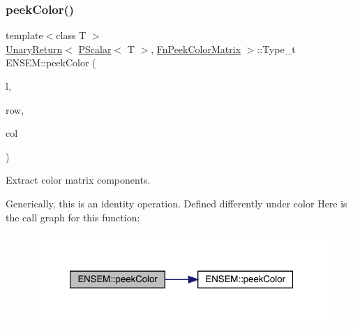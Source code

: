 \subsubsection{\texorpdfstring{peekColor()}{peekColor()}\hspace{0.1cm}{\footnotesize\ttfamily [2/2]}}
{\footnotesize\ttfamily template$<$class T $>$ \\
\mbox{\hyperlink{structENSEM_1_1UnaryReturn}{Unary\+Return}}$<$ \mbox{\hyperlink{classENSEM_1_1PScalar}{P\+Scalar}}$<$ T $>$, \mbox{\hyperlink{structENSEM_1_1FnPeekColorMatrix}{Fn\+Peek\+Color\+Matrix}} $>$\+::Type\+\_\+t E\+N\+S\+E\+M\+::peek\+Color (\begin{DoxyParamCaption}\item[{const \mbox{\hyperlink{classENSEM_1_1PScalar}{P\+Scalar}}$<$ T $>$ \&}]{l,  }\item[{int}]{row,  }\item[{int}]{col }\end{DoxyParamCaption})\hspace{0.3cm}{\ttfamily [inline]}}



Extract color matrix components. 

Generically, this is an identity operation. Defined differently under color Here is the call graph for this function\+:\nopagebreak
\begin{figure}[H]
\begin{center}
\leavevmode
\includegraphics[width=321pt]{db/dcc/group__primscalar_ga5e0077638719795b3ad6bba20ddb9d4d_cgraph}
\end{center}
\end{figure}
\mbox{\label{group__primscalar_gae58d7282a3d7b7cb78a43c300314fd16}} 
